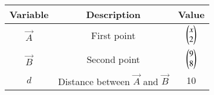 \begin{tabular}[12pt]{ |c|c|c|}
    \hline
	\textbf{Variable} & \textbf{Description} & \textbf{Value}\\ 
    \hline
	$\vec{A}$ & First point & $\begin{pmatrix}x\\2\end{pmatrix}$\\
    \hline 
	$\vec{B}$ & Second point & $\begin{pmatrix}9\\8\end{pmatrix}$\\
    \hline
	$d$ & Distance between $\vec{A}$ and $\vec{B}$ & 10\\
    \hline
    \end{tabular}

